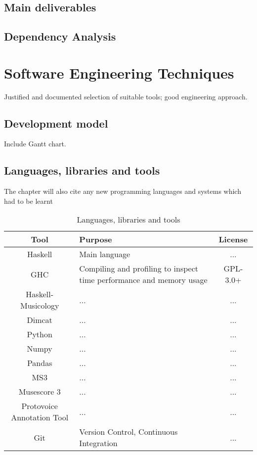 \documentclass[12pt,a4paper,twoside,openright]{report}
\begin{document}
\subsection{Main deliverables}

\subsection{Dependency Analysis}

\section{Software Engineering Techniques}
Justified and documented selection of suitable tools; good engineering approach.

\subsection{Development model}
Include Gantt chart.

\subsection{Languages, libraries and tools}
The chapter will also cite any new programming languages and systems which had to be learnt 

\begin{table}
  {
  \small
  \caption{Languages, libraries and tools}
  \label{Languages}
  \begin{center}
    \begin{tabularx}{.9\textwidth}{cXc}
      Tool & Purpose & License \\
      \toprule
      Haskell & Main language & ... \\
      \midrule
      GHC & Compiling and profiling to inspect time performance and memory usage  & GPL-3.0+ \\
      \midrule
      Haskell-Musicology & ... & ... \\
      \midrule
      Dimcat & ... & ... \\
      \midrule
      Python & ... & ... \\
      \midrule
      Numpy & ... & ... \\
      \midrule
      Pandas & ... & ... \\
      \midrule
      MS3 & ... & ... \\
      \midrule
      Musescore 3 & ... & ... \\
      \midrule
      Protovoice Annotation Tool & ... & ... \\
      \midrule
      Git & Version Control, Continuous Integration & ... \\
      \bottomrule
    \end{tabularx}
  \end{center}
  }
\end{table}
\end{document}
